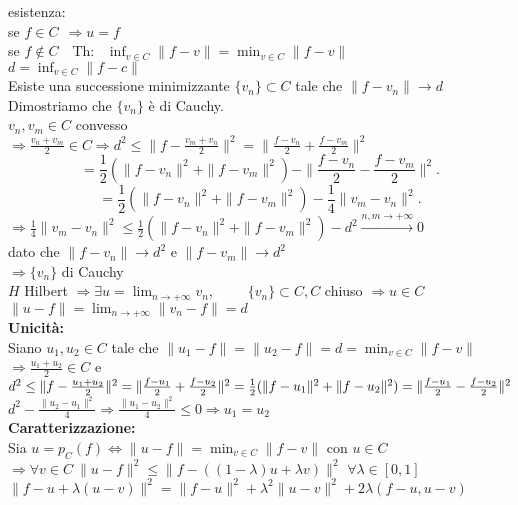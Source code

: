 \documentclass[12px]{article}
\begin{document}
  \begin{dimo}
  	esistenza:\\
	se $f\in C\ \ \Rightarrow u =f $\\
	se $f\not \in C$\ \ Th: \ $\inf_{v\in C}\|f-v\| = \min_{v\in C}\|f-v\|$\\
	$d = \inf_{v\in C}\|f-c\|$\\
	Esiste una successione minimizzante  $\{v_n\}\subset C$ tale che  $\|f-v_n\| \rightarrow d$ \\
	Dimostriamo che $\{v_n\}$ è di Cauchy.\\
	$v_n,v_m\in C$ convesso  \\ $ \displaystyle\Rightarrow \frac{v_n + v_m}{2}\in C \Rightarrow  d^2\leq \|f-\frac{v_m + v_n}{2}\|^2 = \|\frac{f-v_n}2 + \frac {f - v_m}2\|^2$ \\
	\[
	= \frac 12 (\|f-v_n\|^2 + \|f-v_m\|^2) - \|\frac{f-v_n}2-\frac{f-v_m}2\|^2
	.\] 
	\[
	= \frac 12(\|f-v_n\|^2 + \|f-v_m\|^2) - \frac 14\|v_m-v_n\|^2
	.\] 
	$ \Rightarrow  \frac 14\|v_m - v_n\|^2\leq \frac 12 (\|f-v_n\|^2 + \|f-v_m\|^2) - d^2 \xrightarrow{n,m \rightarrow +\infty} 0$ \\
	dato che $\|f-v_n\| \rightarrow d^2$ e $\|f-v_m\| \rightarrow d^2$\\
	$ \Rightarrow  \{v_n\}$ di Cauchy\\
	$H$ Hilbert $ \Rightarrow  \exists u = \lim_{n \rightarrow +\infty} v_n$,\ \ \ \ \  $\{v_n\}\subset C, C$ chiuso $ \Rightarrow  u\in C$ \\
	$\|u-f\| = \lim_{n \rightarrow +\infty} \|v_n-f\| = d$\\
	\textbf{Unicità:}\\
	Siano $u_1,u_2\in C$ tale che $\|u_1-f\| = \|u_2-f\| = d = \min_{v\in C}\|f-v\|$\\
	$ \Rightarrow  \frac{u_1 + u_2}2\in C$ e $d^2 \leq \|f-\frac{u_1+u_2}2\|^2 = \|\frac{f- u_1}2 + \frac {f-u_2}2\|^2\\
	= \frac 12(\|f-u_1\|^2 + \|f-u_2\|^2) = \|\frac{f-u_1}2 - \frac {f-u_2}2\|^2$\\
	$d^2 - \frac{\|u_2-u_1\|^2}{4} \Rightarrow \frac{\|u_1-u_2\|^2}{4}\leq 0 \Rightarrow  u_1=u_2$ \\
	\textbf{Caratterizzazione:}\\
	Sia $u = p_C(f) \Leftrightarrow \|u-f\| = \min_{v\in C}\|f-v\|$ con $u\in C$\\
	$ \Rightarrow  \forall v\in C \ \|u-f\|^2 \leq \|f-((1-\lambda)u + \lambda v)\|^2$ $\forall \lambda \in [0,1]$\\
	$\|f - u + \lambda(u-v)\|^2 = \|f-u\|^2 + \lambda^2\|u-v\|^2 + 2\lambda (f-u,u-v)$\\

\end{dimo}
\end{document}
